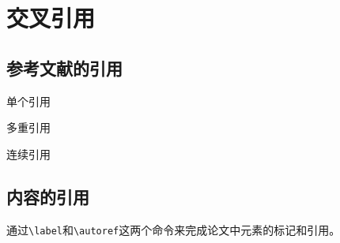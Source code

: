 \documentclass[../../main.tex]{subfiles}
\begin{document}
\section{交叉引用}

\subsection{参考文献的引用}
单个引用

多重引用

连续引用





\subsection{内容的引用}

通过\verb|\label|和\verb|\autoref|这两个命令来完成论文中元素的标记和引用。
\end{document}
